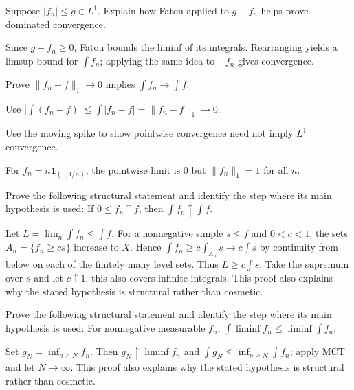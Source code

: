 \begin{problem}\label{prob:iii04-problem-06}
Suppose \(|f_n|\le g\in L^1\). Explain how Fatou applied to \(g-f_n\) helps prove dominated convergence.
\end{problem}
\begin{solution}
Since \(g-f_n\ge0\), Fatou bounds the liminf of its integrals. Rearranging
yields a limsup bound for \(\int f_n\); applying the same idea to \(-f_n\)
gives convergence.
\end{solution}

\begin{problem}\label{prob:iii04-problem-07}
Prove \(\|f_n-f\|_1\to0\) implies \(\int f_n\to\int f\).
\end{problem}
\begin{solution}
Use
\(\left|\int(f_n-f)\right|\le\int|f_n-f|=\|f_n-f\|_1\to0\).
\end{solution}

\begin{problem}\label{prob:iii04-problem-08}
Use the moving spike to show pointwise convergence need not imply \(L^1\) convergence.
\end{problem}
\begin{solution}
For \(f_n=n\mathbf1_{(0,1/n)}\), the pointwise limit is \(0\) but
\(\|f_n\|_1=1\) for all \(n\).
\end{solution}

\begin{problem}\label{prob:iii04-problem-09}
Prove the following structural statement and identify the step where its main hypothesis is used: If $0\le f_n\uparrow f$, then $\int f_n\uparrow\int f$.
\end{problem}
\begin{solution}
Let $L=\lim_n\int f_n\le\int f$. For a nonnegative simple $s\le f$ and $0<c<1$, the sets $A_n=\{f_n\ge cs\}$ increase to $X$. Hence $\int f_n\ge c\int_{A_n}s\to c\int s$ by continuity from below on each of the finitely many level sets. Thus $L\ge c\int s$. Take the supremum over $s$ and let $c\uparrow1$; this also covers infinite integrals. This proof also explains why the stated hypothesis is structural rather than cosmetic.
\end{solution}

\begin{problem}\label{prob:iii04-problem-10}
Prove the following structural statement and identify the step where its main hypothesis is used: For nonnegative measurable $f_n$, $\int\liminf f_n\le\liminf\int f_n$.
\end{problem}
\begin{solution}
Set $g_N=\inf_{n\ge N}f_n$. Then $g_N\uparrow\liminf f_n$ and $\int g_N\le\inf_{n\ge N}\int f_n$; apply MCT and let $N\to\infty$. This proof also explains why the stated hypothesis is structural rather than cosmetic.
\end{solution}

